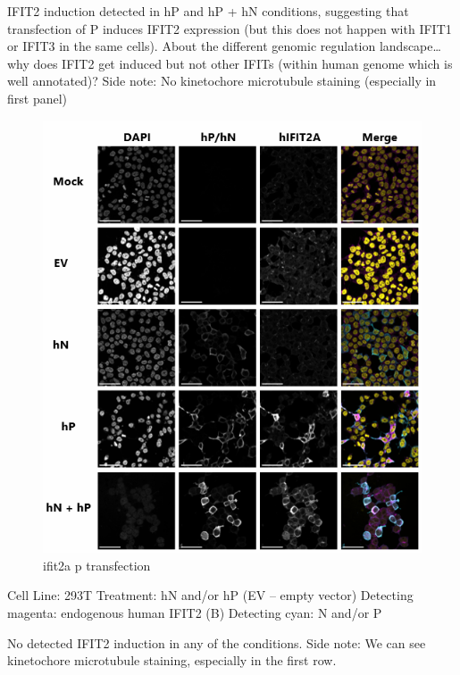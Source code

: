 IFIT2 induction detected in hP and hP + hN conditions, suggesting that transfection of P induces IFIT2 expression (but this does not happen with IFIT1 or IFIT3 in the same cells).
About the different genomic regulation landscape… why does IFIT2 get induced but not other IFITs (within human genome which is well annotated)? 
Side note: No kinetochore microtubule staining (especially in first panel)

\begin{figure}
    \centering
    \includegraphics[width=1\linewidth]{09. Chapter 4//Figs//04. IFIT2AB Discussion/03. ifit2a p transfection.png}
    \caption[ifit2a p transfection]{ifit2a p transfection}
    \label{ifit2a p transfection}
\end{figure}

Cell Line: 293T \newline
Treatment: hN and/or hP (EV – empty vector) \newline
Detecting magenta: endogenous human IFIT2 (B) \newline
Detecting cyan: N and/or P \newline

No detected IFIT2 induction in any of the conditions.
Side note: We can see kinetochore microtubule staining, especially in the first row.

